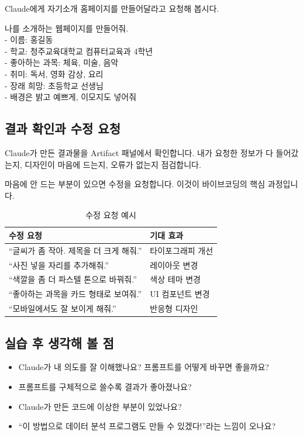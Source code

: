 \documentclass[11pt, a4paper]{article}
\begin{document}
Claude에게 자기소개 홈페이지를 만들어달라고 요청해 봅시다.

\begin{promptbox}
나를 소개하는 웹페이지를 만들어줘.\\
- 이름: 홍길동\\
- 학교: 청주교육대학교 컴퓨터교육과 4학년\\
- 좋아하는 과목: 체육, 미술, 음악\\
- 취미: 독서, 영화 감상, 요리\\
- 장래 희망: 초등학교 선생님\\
- 배경은 밝고 예쁘게, 이모지도 넣어줘
\end{promptbox}

\subsection{결과 확인과 수정 요청}

Claude가 만든 결과물을 Artifact 패널에서 확인합니다. 내가 요청한 정보가 다 들어갔는지, 디자인이 마음에 드는지, 오류가 없는지 점검합니다.

마음에 안 드는 부분이 있으면 수정을 요청합니다. 이것이 바이브코딩의 핵심 과정입니다.

\begin{table}[H]\centering
\caption{수정 요청 예시}
\begin{tabular}{ll}\toprule
\textbf{수정 요청} & \textbf{기대 효과} \\\midrule
``글씨가 좀 작아. 제목을 더 크게 해줘.'' & 타이포그래피 개선 \\
``사진 넣을 자리를 추가해줘.'' & 레이아웃 변경 \\
``색깔을 좀 더 파스텔 톤으로 바꿔줘.'' & 색상 테마 변경 \\
``좋아하는 과목을 카드 형태로 보여줘.'' & UI 컴포넌트 변경 \\
``모바일에서도 잘 보이게 해줘.'' & 반응형 디자인 \\
\bottomrule
\end{tabular}
\end{table}

\subsection{실습 후 생각해 볼 점}

\begin{itemize}[leftmargin=1.5em]
\item Claude가 내 의도를 잘 이해했나요? 프롬프트를 어떻게 바꾸면 좋을까요?
\item 프롬프트를 구체적으로 쓸수록 결과가 좋아졌나요?
\item Claude가 만든 코드에 이상한 부분이 있었나요?
\item ``이 방법으로 데이터 분석 프로그램도 만들 수 있겠다!''라는 느낌이 오나요?
\end{itemize}
\end{document}
